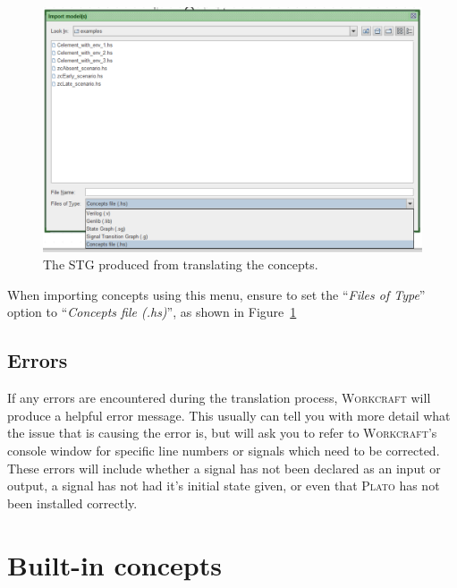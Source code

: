 \documentclass[british,technote,compsoc]{IEEEtran}
\newcommand{\noun}[1]{\textsc{#1}}
\begin{document}
\begin{figure}[H]
\begin{centering}
\includegraphics[scale=0.4]{images/import_menu_screenshot}
\par\end{centering}

\begin{centering}
\protect\caption{\label{fig:import_menu_screenshot}The STG produced from translating the concepts.}

\par\end{centering}

\end{figure}

When importing concepts using this menu, ensure to set the ``\emph{Files of Type}'' option to ``\emph{Concepts file (.hs)}'', as shown in Figure~\ref{fig:import_menu_screenshot}

\subsection{Errors}

If any errors are encountered during the translation process, \noun{Workcraft} will produce a helpful error message. 
This usually can tell you with more detail what the issue that is causing the error is, but will ask you to refer to \noun{Workcraft}'s console window for specific line numbers or signals which 
need to be corrected. 
These errors will include whether a signal has not been declared as an input or output,
a signal has not had it's initial state given, or even that \noun{Plato} has not been installed correctly. 

\section{Built-in concepts \label{sub:built-in_concepts}}
\end{document}
